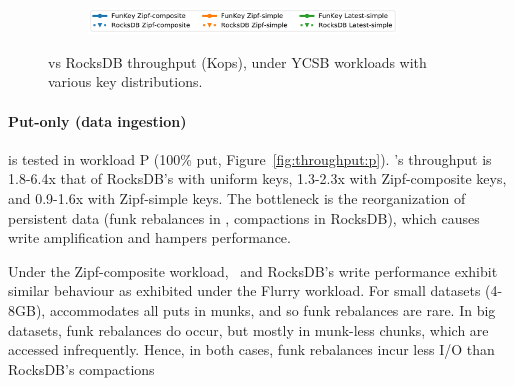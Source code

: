 \begin{figure}[tb]
\begin{subfigure}{\linewidth}
\centerline{
\includegraphics[width=0.9\textwidth]{figs/legend.pdf}
}
\end{subfigure}
\caption{
{\sys\/ vs RocksDB throughput (Kops), under YCSB workloads with various key distributions.}
}
\label{fig:throughput}
\end{figure}


\paragraph{ Put-only (data ingestion)} is tested in workload
{P} (100\% put, Figure~\ref{fig:throughput:p}). 
\sys's throughput is 1.8-6.4x that of RocksDB's with uniform keys, 1.3-2.3x with Zipf-composite keys, 
and 0.9-1.6x with Zipf-simple keys. The bottleneck is the reorganization of persistent data  
(funk rebalances in \sys, compactions in RocksDB), which causes write amplification and hampers performance. 
 
 Under the Zipf-composite workload, \sys\ and RocksDB's write performance exhibit similar behaviour as exhibited under the Flurry workload.
For small datasets (4-8GB), \sys\/ accommodates 
all puts in munks, and so funk rebalances are rare. In big datasets, funk rebalances do occur, but mostly in 
munk-less chunks, which are accessed infrequently. Hence, in both cases, funk rebalances incur less I/O than RocksDB's compactions

